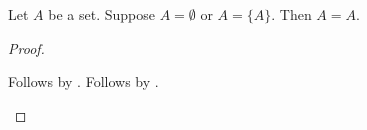 \begin{proposition}\label{exact_local_disjunction_cases}
    Let $A$ be a set.
    Suppose $A=\emptyset$ or $A=\{A\}$.
    Then $A=A$.
\end{proposition}
\begin{proof}
    \begin{byCase}
        Follows by \auto.
        Follows by \auto.
    \end{byCase}
\end{proof}
